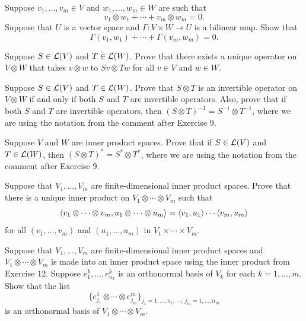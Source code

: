 \begin{exc}
\begin{exercise}
Suppose $v_1,\dots,v_m\in V$ and $w_1,\dots,w_m\in W$ are such that
\[ v_1\otimes w_1+\cdots+v_m\otimes w_m = 0. \]
Suppose that $U$ is a vector space and $\Gamma\colon V\times W\to U$ is a
bilinear map. Show that
\[ \Gamma(v_1,w_1)+\cdots+\Gamma(v_m,w_m) = 0. \]
\end{exercise}

\begin{exercise}
Suppose $S\in\mathcal{L}(V)$ and $T\in\mathcal{L}(W)$. Prove that there exists a unique
operator on $V\otimes W$ that takes $v\otimes w$ to $Sv\otimes Tw$ for all
$v\in V$ and $w\in W$.
\end{exercise}

\begin{exercise}
Suppose $S\in\mathcal{L}(V)$ and $T\in\mathcal{L}(W)$. Prove that $S\otimes T$ is an
invertible operator on $V\otimes W$ if and only if both $S$ and $T$ are
invertible operators. Also, prove that if both $S$ and $T$ are invertible
operators, then $(S\otimes T)^{-1}=S^{-1}\otimes T^{-1}$, where we are using the
notation from the comment after Exercise 9.
\end{exercise}

\begin{exercise}
Suppose $V$ and $W$ are inner product spaces. Prove that if $S\in\mathcal{L}(V)$ and
$T\in\mathcal{L}(W)$, then $(S\otimes T)^*=S^*\otimes T^*$, where we are using the
notation from the comment after Exercise 9.
\end{exercise}

\begin{exercise}
Suppose that $V_1,\dots,V_m$ are finite-dimensional inner product spaces.
Prove that there is a unique inner product on $V_1\otimes\cdots\otimes V_m$
such that
\[ \langle v_1\otimes\cdots\otimes v_m, u_1\otimes\cdots\otimes u_m \rangle
   = \langle v_1, u_1 \rangle\cdots\langle v_m, u_m \rangle \]
for all $(v_1,\dots,v_m)$ and $(u_1,\dots,u_m)$ in $V_1\times\cdots\times V_m$.
\end{exercise}

\begin{exercise}
Suppose that $V_1,\dots,V_m$ are finite-dimensional inner product spaces and
$V_1\otimes\cdots\otimes V_m$ is made into an inner product space using the
inner product from Exercise 12. Suppose $e^k_1,\dots,e^k_{n_k}$ is an
orthonormal basis of $V_k$ for each $k=1,\dots,m$. Show that the list
\[ \{e^1_{j_1}\otimes\cdots\otimes e^m_{j_m}\}_{j_1=1,\dots,n_1;\,\cdots;\,
   j_m=1,\dots,n_m} \]
is an orthonormal basis of $V_1\otimes\cdots\otimes V_m$.
\end{exercise}
\end{exc}
